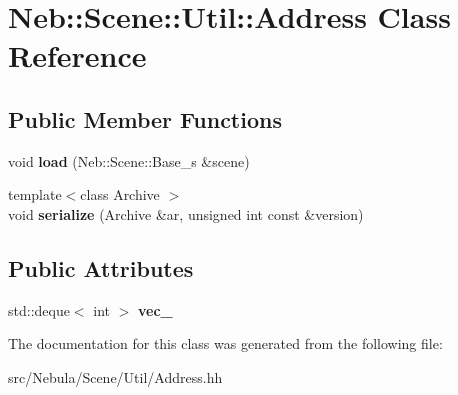 \hypertarget{classNeb_1_1Scene_1_1Util_1_1Address}{\section{\-Neb\-:\-:\-Scene\-:\-:\-Util\-:\-:\-Address \-Class \-Reference}
\label{classNeb_1_1Scene_1_1Util_1_1Address}
}
\subsection*{\-Public \-Member \-Functions}
\begin{DoxyCompactItemize}
\item 
\hypertarget{classNeb_1_1Scene_1_1Util_1_1Address_ae4409eea6d35da7a354c011fe74fd94a}{void {\bfseries load} (\-Neb\-::\-Scene\-::\-Base\-\_\-s \&scene)}\label{classNeb_1_1Scene_1_1Util_1_1Address_ae4409eea6d35da7a354c011fe74fd94a}

\item 
\hypertarget{classNeb_1_1Scene_1_1Util_1_1Address_a7c3dfcdd9c073e169603fe44772df595}{{\footnotesize template$<$class Archive $>$ }\\void {\bfseries serialize} (\-Archive \&ar, unsigned int const \&version)}\label{classNeb_1_1Scene_1_1Util_1_1Address_a7c3dfcdd9c073e169603fe44772df595}

\end{DoxyCompactItemize}
\subsection*{\-Public \-Attributes}
\begin{DoxyCompactItemize}
\item 
\hypertarget{classNeb_1_1Scene_1_1Util_1_1Address_a98b29eceff22208c84aecf9e32bc6a49}{std\-::deque$<$ int $>$ {\bfseries vec\-\_\-}}\label{classNeb_1_1Scene_1_1Util_1_1Address_a98b29eceff22208c84aecf9e32bc6a49}

\end{DoxyCompactItemize}


\-The documentation for this class was generated from the following file\-:\begin{DoxyCompactItemize}
\item 
src/\-Nebula/\-Scene/\-Util/\-Address.\-hh\end{DoxyCompactItemize}
